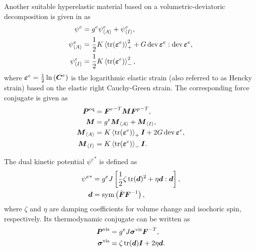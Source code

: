 Another suitable hyperelastic material based on a volumetric-deviatoric decomposition is given in \cite{brandon2020cohesive} as
\begin{subequations}
  \begin{align}
    \psi^e               & =  g^e \psi^e_{\left< A \right>} + \psi^e_{\left< I \right>},                                     \\
    \psi^e_{\left< A \right>}   & = \dfrac{1}{2} K \left<\operatorname{tr}(\boldsymbol{\varepsilon}^e)\right>_+^2 + G \operatorname{dev}{\boldsymbol{\varepsilon}^e} : \operatorname{dev}{\boldsymbol{\varepsilon}^e}, \\
    \psi^e_{\left< I \right>} & = \dfrac{1}{2} K \left<\operatorname{tr}(\boldsymbol{\varepsilon}^e)\right>_-^2,                                       
  \end{align}
\end{subequations}
where $\boldsymbol{\varepsilon}^e = \frac{1}{2} \ln\left( \boldsymbol{C}^e \right)$ is the logarithmic elastic strain (also referred to as Hencky strain) based on the elastic right Cauchy-Green strain. The corresponding force conjugate is given as
\begin{align}
  \boldsymbol{P}^\text{eq}     & = {\boldsymbol{F}^e}^{-T} \boldsymbol{M} {\boldsymbol{F}^p}^{-T},                 \\
  \boldsymbol{M}               & = g^e \boldsymbol{M}_{\left< A \right>} + \boldsymbol{M}_{\left< I \right>},                \\
  \boldsymbol{M}_{\left< A \right>}   & = K \left<\operatorname{tr}(\boldsymbol{\varepsilon}^e)\right>_+ \boldsymbol{I} + 2 G \operatorname{dev}{\boldsymbol{\varepsilon}^e}, \\
  \boldsymbol{M}_{\left< I \right>} & = K \left<\operatorname{tr}(\boldsymbol{\varepsilon}^e)\right>_- \boldsymbol{I}.                       
\end{align}

The dual kinetic potential ${\psi^e}^*$ is defined as
\begin{subequations}
  \begin{align}
    {\psi^e}^* & = g^e J \left[ \dfrac{1}{2}\zeta \operatorname{tr}(\boldsymbol{d})^2 + \eta \boldsymbol{d}:\boldsymbol{d} \right], \\
    \boldsymbol{d}       & = \operatorname{sym}\left( \dot{\boldsymbol{F}}\boldsymbol{F}^{-1} \right),                      
  \end{align}
\end{subequations}
where $\zeta$ and $\eta$ are damping coefficients for volume change and isochoric spin, respectively. Its thermodynamic conjugate can be written as
\begin{subequations}
  \begin{align}
    \boldsymbol{P}^\text{vis}    & = g^e J \boldsymbol{\sigma}^\text{vis} \boldsymbol{F}^{-T}, \\
    \boldsymbol{\sigma}^\text{vis} & = \zeta \operatorname{tr}(\boldsymbol{d}) \boldsymbol{I} + 2 \eta \boldsymbol{d}.     
  \end{align}
\end{subequations}

